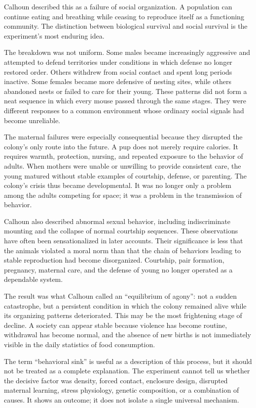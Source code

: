 ﻿\documentclass[12pt,a4paper]{book}
\begin{document}
Calhoun described this as a failure of social organization. A population can continue eating and breathing while ceasing to reproduce itself as a functioning community. The distinction between biological survival and social survival is the experiment's most enduring idea.

The breakdown was not uniform. Some males became increasingly aggressive and attempted to defend territories under conditions in which defense no longer restored order. Others withdrew from social contact and spent long periods inactive. Some females became more defensive of nesting sites, while others abandoned nests or failed to care for their young. These patterns did not form a neat sequence in which every mouse passed through the same stages. They were different responses to a common environment whose ordinary social signals had become unreliable.

The maternal failures were especially consequential because they disrupted the colony's only route into the future. A pup does not merely require calories. It requires warmth, protection, nursing, and repeated exposure to the behavior of adults. When mothers were unable or unwilling to provide consistent care, the young matured without stable examples of courtship, defense, or parenting. The colony's crisis thus became developmental. It was no longer only a problem among the adults competing for space; it was a problem in the transmission of behavior.

Calhoun also described abnormal sexual behavior, including indiscriminate mounting and the collapse of normal courtship sequences. These observations have often been sensationalized in later accounts. Their significance is less that the animals violated a moral norm than that the chain of behaviors leading to stable reproduction had become disorganized. Courtship, pair formation, pregnancy, maternal care, and the defense of young no longer operated as a dependable system.

The result was what Calhoun called an ``equilibrium of agony'': not a sudden catastrophe, but a persistent condition in which the colony remained alive while its organizing patterns deteriorated. This may be the most frightening stage of decline. A society can appear stable because violence has become routine, withdrawal has become normal, and the absence of new births is not immediately visible in the daily statistics of food consumption.

The term ``behavioral sink'' is useful as a description of this process, but it should not be treated as a complete explanation. The experiment cannot tell us whether the decisive factor was density, forced contact, enclosure design, disrupted maternal learning, stress physiology, genetic composition, or a combination of causes. It shows an outcome; it does not isolate a single universal mechanism.
\end{document}
